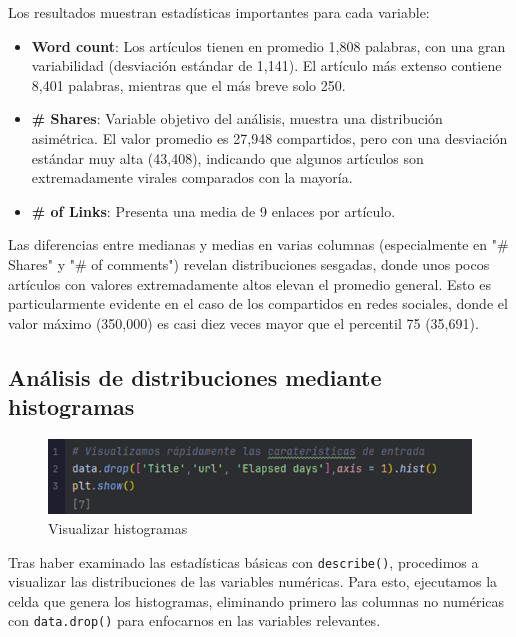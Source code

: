 \documentclass[12pt, a4paper]{article}
\begin{document}
Los resultados muestran estadísticas importantes para cada variable:
\begin{itemize}
    \item\textbf{Word count}: Los artículos tienen en promedio 1,808 palabras, con una gran variabilidad (desviación estándar de 1,141). El artículo más extenso contiene 8,401 palabras, mientras que el más breve solo 250.
    \item\textbf{\# Shares}: Variable objetivo del análisis, muestra una distribución asimétrica. El valor promedio es 27,948 compartidos, pero con una desviación estándar muy alta (43,408), indicando que algunos artículos son extremadamente virales comparados con la mayoría.
    \item\textbf{\# of Links}: Presenta una media de 9 enlaces por artículo.
\end{itemize}

Las diferencias entre medianas y medias en varias columnas (especialmente en "\# Shares" y "\# of comments") revelan distribuciones sesgadas, donde unos pocos artículos con valores extremadamente altos elevan el promedio general. Esto es particularmente evidente en el caso de los compartidos en redes sociales, donde el valor máximo (350,000) es casi diez veces mayor que el percentil 75 (35,691).

\subsection{Análisis de distribuciones mediante histogramas}

\begin{figure}[H]
    \centering
    \includegraphics[width=1.0\textwidth]{Actividad-9/Imagen5.png}
    \caption{Visualizar histogramas}
\end{figure}

Tras haber examinado las estadísticas básicas con \texttt{describe()}, procedimos a visualizar las distribuciones de las variables numéricas. Para esto, ejecutamos la celda que genera los histogramas, eliminando primero las columnas no numéricas con \texttt{data.drop()} para enfocarnos en las variables relevantes.
\end{document}
